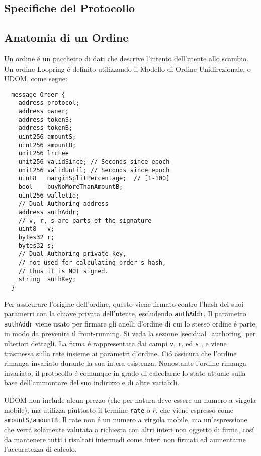 \documentclass[UTF8,nofonts]{article}
\begin{document}
\begin{multicols}{2}
\section{Specifiche del Protocollo\label{sec:protocol}}

\subsection{Anatomia di un Ordine\label{anatomy}}
Un ordine \'e un pacchetto di dati che descrive l'intento dell'utente allo scambio. Un ordine Loopring  \'e definito utilizzando il Modello di Ordine Unidirezionale, o UDOM, come segue:

\begin{verbatim}
  message Order {
    address protocol;
    address owner;
    address tokenS;
    address tokenB;
    uint256 amountS;
    uint256 amountB;
    unit256 lrcFee
    unit256 validSince; // Seconds since epoch
    unit256 validUntil; // Seconds since epoch
    uint8   marginSplitPercentage;  // [1-100]
    bool    buyNoMoreThanAmountB;
    uint256 walletId;
    // Dual-Authoring address
    address authAddr;
   	// v, r, s are parts of the signature
    uint8   v;
    bytes32 r;
    bytes32 s;
    // Dual-Authoring private-key,
    // not used for calculating order's hash,
    // thus it is NOT signed.
    string  authKey;
  }
\end{verbatim}


Per assicurare l'origine dell'ordine, questo viene firmato contro l'hash dei suoi parametri con la chiave privata dell'utente, escludendo \verb|authAddr|. Il parametro \verb|authAddr| viene usato per firmare gli anelli d'ordine di cui lo stesso ordine \'e parte, in modo da prevenire il front-running. Si veda la sezione \ref{sec:dual_authoring} per ulteriori dettagli. La firma \'e rappresentata dai campi \verb|v|, \verb|r|, ed \verb|s| , e viene trasmessa sulla rete insieme ai parametri d'ordine. Ci\'o assicura che l'ordine rimanga invariato durante la sua intera esistenza. Nonostante l'ordine rimanga invariato, il protocollo \'e comunque in grado di calcolarne lo stato attuale sulla base dell'ammontare del suo indirizzo e di altre variabili.


UDOM non include alcun prezzo (che per natura deve essere un numero a virgola mobile), ma utilizza piuttosto il termine \verb|rate| o $r$, che viene espresso come \verb|amountS|/\verb|amountB|. Il rate non \'e un numero a virgola mobile, ma un'espressione che verr\'a solamente valutata a richiesta con altri interi non oggetto di firma, cos\'i da mantenere tutti i risultati intermedi come interi non firmati ed aumentarne l'accuratezza di calcolo.


\end{multicols}
\end{document}
